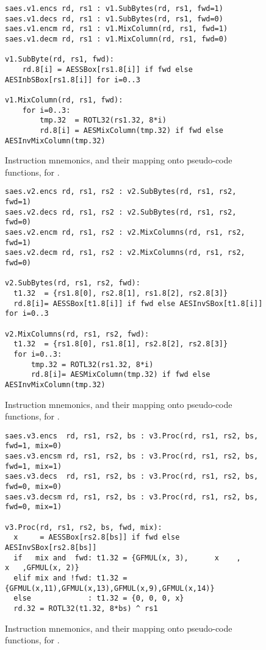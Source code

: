 
\begin{figure}[p]
\begin{lstlisting}[language=pseudo,style=block]
saes.v1.encs rd, rs1 : v1.SubBytes(rd, rs1, fwd=1)
saes.v1.decs rd, rs1 : v1.SubBytes(rd, rs1, fwd=0)
saes.v1.encm rd, rs1 : v1.MixColumn(rd, rs1, fwd=1)
saes.v1.decm rd, rs1 : v1.MixColumn(rd, rs1, fwd=0)

v1.SubByte(rd, rs1, fwd):
    rd.8[i] = AESSBox[rs1.8[i]] if fwd else AESInbSBox[rs1.8[i]] for i=0..3

v1.MixColumn(rd, rs1, fwd):
    for i=0..3:
        tmp.32  = ROTL32(rs1.32, 8*i)
        rd.8[i] = AESMixColumn(tmp.32) if fwd else AESInvMixColumn(tmp.32)
\end{lstlisting}
\caption{
  Instruction mnemonics, and their mapping onto pseudo-code functions, for .
}
\label{fig:v1:pseudo}
\end{figure}

\begin{figure}[p]
\begin{lstlisting}[language=pseudo,style=block]
saes.v2.encs rd, rs1, rs2 : v2.SubBytes(rd, rs1, rs2, fwd=1)
saes.v2.decs rd, rs1, rs2 : v2.SubBytes(rd, rs1, rs2, fwd=0)
saes.v2.encm rd, rs1, rs2 : v2.MixColumns(rd, rs1, rs2, fwd=1)
saes.v2.decm rd, rs1, rs2 : v2.MixColumns(rd, rs1, rs2, fwd=0)

v2.SubBytes(rd, rs1, rs2, fwd):
  t1.32  = {rs1.8[0], rs2.8[1], rs1.8[2], rs2.8[3]}
  rd.8[i]= AESSBox[t1.8[i]] if fwd else AESInvSBox[t1.8[i]] for i=0..3

v2.MixColumns(rd, rs1, rs2, fwd):
  t1.32  = {rs1.8[0], rs1.8[1], rs2.8[2], rs2.8[3]}
  for i=0..3:
      tmp.32 = ROTL32(rs1.32, 8*i)
      rd.8[i]= AESMixColumn(tmp.32) if fwd else AESInvMixColumn(tmp.32)
\end{lstlisting}
\caption{
  Instruction mnemonics, and their mapping onto pseudo-code functions, for .
}
\label{fig:v2:pseudo}
\end{figure}

\begin{figure}[p]
\begin{lstlisting}[language=pseudo,style=block]
saes.v3.encs  rd, rs1, rs2, bs : v3.Proc(rd, rs1, rs2, bs, fwd=1, mix=0)
saes.v3.encsm rd, rs1, rs2, bs : v3.Proc(rd, rs1, rs2, bs, fwd=1, mix=1)
saes.v3.decs  rd, rs1, rs2, bs : v3.Proc(rd, rs1, rs2, bs, fwd=0, mix=0)
saes.v3.decsm rd, rs1, rs2, bs : v3.Proc(rd, rs1, rs2, bs, fwd=0, mix=1)

v3.Proc(rd, rs1, rs2, bs, fwd, mix):
  x     = AESSBox[rs2.8[bs]] if fwd else AESInvSBox[rs2.8[bs]]
  if   mix and  fwd: t1.32 = {GFMUL(x, 3),      x    ,      x   ,GFMUL(x, 2)}
  elif mix and !fwd: t1.32 = {GFMUL(x,11),GFMUL(x,13),GFMUL(x,9),GFMUL(x,14)}
  else             : t1.32 = {0, 0, 0, x}
  rd.32 = ROTL32(t1.32, 8*bs) ^ rs1
\end{lstlisting}
\caption{
  Instruction mnemonics, and their mapping onto pseudo-code functions, for .
}
\label{fig:v3:pseudo}
\end{figure}

